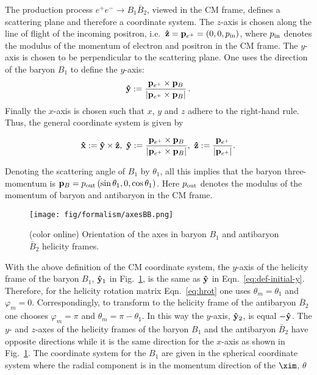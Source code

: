 The production process $e^+e^-\to B_1\bar B_2$, 
viewed in the CM frame, defines a 
scattering plane and therefore a coordinate system. The $z$-axis is 
chosen along the line of flight  of the incoming
positron, i.e.\ ${\bf\hat z}={\bf p}_{e^+} = (0,0,p_{\rm in})$, where $p_{\rm in}$ 
denotes the modulus of the momentum of electron and positron in the 
CM frame. The $y$-axis is chosen to be perpendicular to 
the scattering plane. One uses the direction of the baryon $B_1$ to 
define the $y$-axis: 
\begin{eqnarray}
  \label{eq:def-initial-y}
  {\bf\hat y} := \frac{{\bf p}_{e^+} \times {\bf p}_B}%
  {\vert {\bf p}_{e^+} \times {\bf p}_B \vert}  \, .
\end{eqnarray}
Finally the $x$-axis is chosen such that $x$, $y$ and $z$ adhere to the 
right-hand rule. Thus, the general coordinate system is given by

\begin{eqnarray}
  \label{eq:def-initial-xyz}
  {\bf\hat x} := {\bf\hat y}\times{\bf\hat z}, \
  {\bf\hat y} := \frac{{\bf p}_{e^+} \times {\bf p}_B}
  {\vert {\bf p}_{e^+} \times {\bf p}_B \vert}  , \ {\bf\hat z} := \frac{{\bf p}_{e^+}}{\vert {\bf p}_{e^+} \vert } .
\end{eqnarray}

Denoting the scattering angle of $B_1$ 
by $\theta_1$, all this implies that the baryon three-momentum is
${\bf p}_B = p_{\rm out} \, (\sin\theta_1,0,\cos\theta_1)$. 
Here $p_{\rm out}$ denotes the modulus of the 
momentum of baryon and antibaryon in the CM frame.
\begin{figure}
\centering
\texttt{[image: fig/formalism/axesBB.png]}
\caption[]{(color online) Orientation of the axes in baryon $B_1$ and
  antibaryon $\bar B_2$ helicity frames.}
  \label{fig:axes}
\end{figure}
  
With the above definition of the CM coordinate system,
the $y$-axis of
the helicity frame of the baryon $B_1$, ${\bf\hat y}_1$ in Fig.~\ref{fig:axes}, is the same as ${\bf\hat y}$ in
Eqn.~\eqref{eq:def-initial-y}.
Therefore, for the helicity rotation matrix
Eqn.~\eqref{eq:hrot} one uses $\theta_m =\theta_1$ and $\varphi_m =0$.
Correspondingly, to transform to the helicity frame of the antibaryon $\bar B_2$
one chooses $\varphi_m=\pi$ and $\theta_m= \pi-\theta_1$. In this way 
the $y$-axis, ${\bf\hat y}_2$, is equal $-{\bf\hat y}$. The
$y$- and $z$-axes of the helicity frames of the baryon $B_1$ and the antibaryon
$\bar B_2$ have opposite directions while it is the same direction for the $x$-axis as shown in Fig.~\ref{fig:axes}. The coordinate system for the $B_1$ are given in the spherical coordinate system where the radial component is in the momentum direction of the $\xim$, $\theta$


